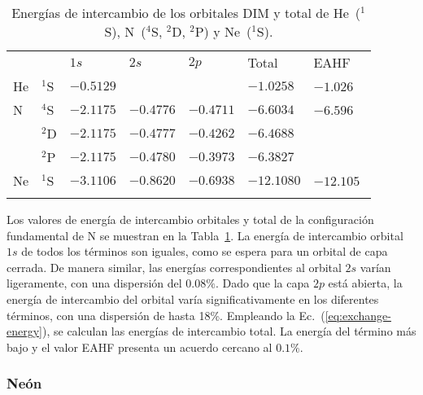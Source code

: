 \begin{table}
\begin{center}
\begin{tabular}{
>{\centering\arraybackslash}p{}
>{\centering\arraybackslash}p{}
>{\centering\arraybackslash}p{}
>{\centering\arraybackslash}p{}
>{\centering\arraybackslash}p{}
>{\raggedleft\arraybackslash}p{}
>{\raggedleft\arraybackslash}p{}}
\rowcolor{mydarkgray} 
   &      & $1s$     & $2s$    & $2p$  & Total  & EAHF~\cite{Becke:88}\,\,\\
He & $^1$S & $-0.5129$ &           &           & $-1.0258$ & $-1.026$ \,\,\\
\rowcolor{mygray} 
N  & $^4$S & $-2.1175$ & $-0.4776$ & $-0.4711$ & $-6.6034$ & $-6.596$ \,\,\\
   & $^2$D & $-2.1175$ & $-0.4777$ & $-0.4262$ & $-6.4688$ & \,\,\\
   \rowcolor{mygray} 
   & $^2$P & $-2.1175$ & $-0.4780$ & $-0.3973$ & $-6.3827$ & \,\,\\
Ne & $^1$S & $-3.1106$ & $-0.8620$ & $-0.6938$ & $-12.1080$& $-12.105$\,\,\\
\rowcolor{mygray} 
\end{tabular}
\caption[Energías de intercambio total y orbitales de He, N y Ne.]
{Energías de intercambio de los orbitales DIM y total de He~($^1$S), 
N~($^4$S, $^2$D, $^2$P) y Ne~($^1$S).}
\label{tab:exchange-atoms}
\end{center}
\end{table}

Los valores de energía de intercambio orbitales y total de la 
configuración fundamental de N se muestran en la 
Tabla~\ref{tab:exchange-atoms}. La energía de intercambio orbital $1s$ 
de todos los términos son iguales, como se espera para un orbital de 
capa cerrada. De manera similar, las energías correspondientes al 
orbital $2s$ varían ligeramente, con una dispersión del $0.08\%$. 
Dado que la capa $2p$ está abierta, la energía de intercambio del 
orbital varía significativamente en los diferentes términos, con una 
dispersión de hasta 18\%. Empleando la Ec.~(\ref{eq:exchange-energy}), 
se calculan las energías de intercambio total. La energía del término 
más bajo y el valor EAHF presenta un acuerdo cercano al $0.1\%$.

\subsubsection{Neón}

